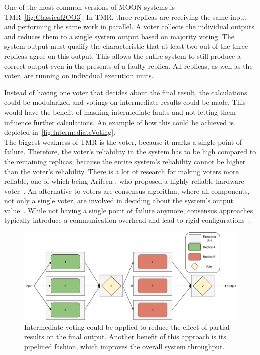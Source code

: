 One of the most common versions of \gls*{MOON} systems is \gls*{TMR}~\autoref{fig:Classical2OO3}.
In \gls*{TMR}, three replicas are receiving the same input and performing the same work in parallel.
A voter collects the individual outputs and reduces them to a single system output based on majority voting.
The system output must qualify the characteristic that at least two out of the three replicas agree on this output.
This allows the entire system to still produce a correct output even in the presents of a faulty replica.
All replicas, as well as the voter, are running on individual execution units.

Instead of having one voter that decides about the final result, the calculations could be modularized and votings on intermediate results could be made.
This would have the benefit of masking intermediate faults and not letting them influence further calculations.
An example of how this could be achieved is depicted in~\autoref{fig:IntermediateVoting}.
\\

The biggest weakness of \gls*{TMR} is the voter, because it marks a single point of failure.
Therefore, the voter's reliability in the system has to be high compared to the remaining replicas, because the entire system's reliability cannot be higher than the voter's reliability.
There is a lot of research for making voters more reliable, one of which being Arifeen \etal, who proposed a highly reliable hardware voter~\cite{ArifeenFaultTolerantTMR}.
An alternative to voters are consensus algorithm, where all components, not only a single voter, are involved in deciding about the system's output value~\cite{lamport2001paxos}.
While not having a single point of failure anymore, consensus approaches typically introduce a communication overhead and lead to rigid configurations~\cite{GamerIncreasingMOON}.

\begin{figure}[!hb]
	\centering
	\includegraphics[width=0.75\linewidth]{images/IntermediateVoting}
	\caption{Intermediate voting could be applied to reduce the effect of partial results on the final output. Another benefit of this approach is its pipelined fashion, which improves the overall system throughput.}
	\label{fig:IntermediateVoting}
\end{figure}


